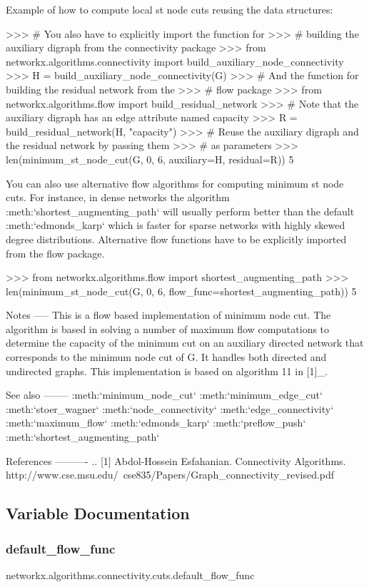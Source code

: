 \begin{DoxyVerb}
Example of how to compute local st node cuts reusing the data
structures:

>>> # You also have to explicitly import the function for
>>> # building the auxiliary digraph from the connectivity package
>>> from networkx.algorithms.connectivity import build_auxiliary_node_connectivity
>>> H = build_auxiliary_node_connectivity(G)
>>> # And the function for building the residual network from the
>>> # flow package
>>> from networkx.algorithms.flow import build_residual_network
>>> # Note that the auxiliary digraph has an edge attribute named capacity
>>> R = build_residual_network(H, "capacity")
>>> # Reuse the auxiliary digraph and the residual network by passing them
>>> # as parameters
>>> len(minimum_st_node_cut(G, 0, 6, auxiliary=H, residual=R))
5

You can also use alternative flow algorithms for computing minimum st
node cuts. For instance, in dense networks the algorithm
:meth:`shortest_augmenting_path` will usually perform better than
the default :meth:`edmonds_karp` which is faster for sparse
networks with highly skewed degree distributions. Alternative flow
functions have to be explicitly imported from the flow package.

>>> from networkx.algorithms.flow import shortest_augmenting_path
>>> len(minimum_st_node_cut(G, 0, 6, flow_func=shortest_augmenting_path))
5

Notes
-----
This is a flow based implementation of minimum node cut. The algorithm
is based in solving a number of maximum flow computations to determine
the capacity of the minimum cut on an auxiliary directed network that
corresponds to the minimum node cut of G. It handles both directed
and undirected graphs. This implementation is based on algorithm 11
in [1]_.

See also
--------
:meth:`minimum_node_cut`
:meth:`minimum_edge_cut`
:meth:`stoer_wagner`
:meth:`node_connectivity`
:meth:`edge_connectivity`
:meth:`maximum_flow`
:meth:`edmonds_karp`
:meth:`preflow_push`
:meth:`shortest_augmenting_path`

References
----------
.. [1] Abdol-Hossein Esfahanian. Connectivity Algorithms.
    http://www.cse.msu.edu/~cse835/Papers/Graph_connectivity_revised.pdf\end{DoxyVerb}
 

\subsection{Variable Documentation}
\mbox{\label{namespacenetworkx_1_1algorithms_1_1connectivity_1_1cuts_a18744b7e797aed1003513ade19d0bcd1}} 
\subsubsection{\texorpdfstring{default\+\_\+flow\+\_\+func}{default\_flow\_func}}
{\footnotesize\ttfamily networkx.\+algorithms.\+connectivity.\+cuts.\+default\+\_\+flow\+\_\+func}


